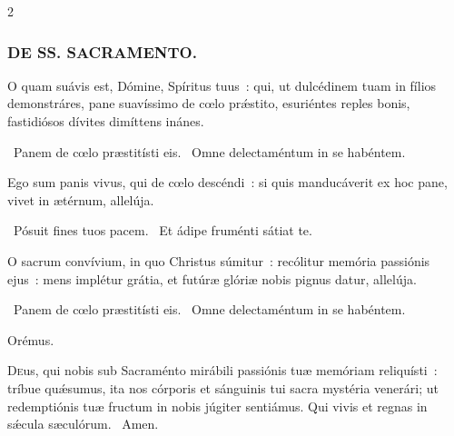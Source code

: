 \documentclass[9pt,twoside]{extarticle}
\begin{document}
\begin{multicols}{2}
{{{\subsubsection*{\center \textsc{DE SS. SACRAMENTO.}}
\begin{tightlist}{}
\item {}
\item {} O quam suávis est, Dómine, Spíritus tuus~: qui, ut dulcédinem tuam in fílios demonstráres, pane suavíssimo de cœlo prǽstito, esuriéntes reples bonis, fastidiósos dívites dimíttens inánes.
\item {}~Panem de cœlo præstitísti eis. ~Omne delectaméntum in se habéntem.
\item {} Ego sum panis vivus, qui de cœlo descéndi~: si quis manducáverit ex hoc pane, vivet in ætérnum, allelúja.
\item {}~Pósuit fines tuos pacem. ~Et ádipe fruménti sátiat te.
\item {} O sacrum convívium, in quo Christus súmitur~: recólitur memória passiónis ejus~: mens implétur grátia, et futúræ glóriæ nobis pignus datur, allelúja.
\item {}~Panem de cœlo præstitísti eis. ~Omne delectaméntum in se habéntem.
\item Orémus. \hfill {}
\end{tightlist}
\lettrine{D}eus, qui nobis sub Sacraménto mirábili passiónis tuæ memóriam reliquísti~: tríbue quǽsumus, ita nos córporis et sánguinis tui sacra mystéria venerári; ut redemptiónis tuæ fructum in nobis júgiter sentiámus. Qui vivis et regnas in sǽcula sæculórum. ~Amen.

}}}
\end{multicols}
\end{document}
